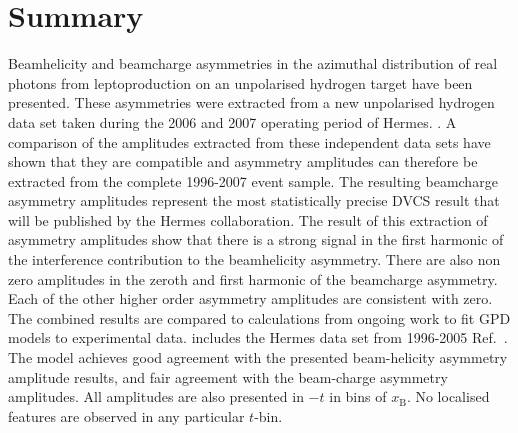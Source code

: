 \section{Summary}

Beam\blue{-}helicity and beam\blue{-}charge asymmetries in the azimuthal distribution of real photons from leptoproduction on an unpolarised hydrogen target have been presented. These asymmetries were extracted from a new unpolarised hydrogen data set taken during the 2006 and 2007 operating period of H{\sc ermes}. . A comparison of the amplitudes extracted from these independent data sets have shown that they are compatible and asymmetry amplitudes can therefore be extracted from the complete 1996-2007 event sample. The resulting beam\blue{-}charge asymmetry amplitudes represent the most statistically precise DVCS result that will be published by the H{\sc ermes} collaboration. The result of this extraction of asymmetry amplitudes show that there is a strong signal in the first harmonic of the interference contribution to the beam\blue{-}helicity asymmetry. There are also non zero amplitudes in the zeroth and first harmonic of the beam\blue{-}charge asymmetry. Each of the other higher order asymmetry amplitudes are consistent with zero. The combined results are compared to calculations from ongoing work to fit GPD models to experimental data.  includes the H{\sc ermes} data set from 1996-2005  Ref.~\cite{Air09}. The model achieves good agreement with the presented beam-helicity asymmetry amplitude results, and fair agreement with the beam-charge asymmetry amplitudes. All amplitudes are also presented  in $-t$ in bins of $x_{\textrm{B}}$. No localised features are observed in any particular $t$-bin.


